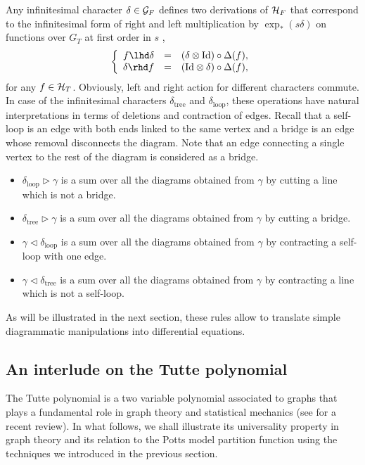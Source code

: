 \documentclass[10pt,here,feynmf]{article}
\begin{document}
Any infinitesimal character $\delta\in{\cal G}_{F}$ defines two derivations of ${\cal H}_{F}$ that correspond to the infinitesimal form of right and left multiplication by $\exp_{\ast}(s\delta)$ on functions over $G_{T}$ at first order in $s$ ,
\begin{equation}
\left\{
\begin{array}{rcl}
f\lhd\delta&=&\left(\delta\otimes\mathrm{Id}\right)\circ\Delta(f),\cr
\delta\rhd f&=&\left(\mathrm{Id}\otimes\delta\right)\circ\Delta(f),
\end{array}
\right.
\end{equation}
for any $f\in{\cal H}_{T}$. Obviously, left and right action for different characters commute. In case of the infinitesimal characters $\delta_{\mathrm{tree}}$ and $\delta_{\mathrm{loop}}$, these operations have natural interpretations in terms of deletions and contraction of edges.  Recall that a self-loop is an edge with both ends linked to the same vertex and a bridge is an edge whose removal disconnects the diagram. Note that an edge connecting a single vertex to the rest of the diagram is considered as a bridge.
\begin{itemize}
\item
$\delta_{\mathrm{loop}}\rhd\gamma$ is a sum over all the diagrams obtained from $\gamma$ by cutting a line which is not a bridge. 
\item
$\delta_{\mathrm{tree}}\rhd\gamma$ is a sum over all the diagrams obtained from $\gamma$ by cutting 
a bridge.
\item
$\gamma\lhd\delta_{\mathrm{loop}}$ is a sum over all the diagrams obtained from $\gamma$ by contracting a self-loop with one edge.
\item
$\gamma\lhd\delta_{\mathrm{tree}}$ is a sum over all the diagrams obtained from $\gamma$ by contracting a line which is not a self-loop.
\end{itemize} 

As will be illustrated in the next section, these rules allow to translate simple diagrammatic manipulations into differential equations.  
 
 \label{diffrelations}

\subsection{An interlude on the Tutte polynomial}
 
The Tutte polynomial is a two variable polynomial associated to graphs that plays a fundamental role in graph theory and statistical mechanics (see \cite{tutte} for a recent review). In what follows, we shall illustrate its universality property in graph theory and its relation to the Potts model partition function using the techniques we introduced in the previous section.
\end{document}
